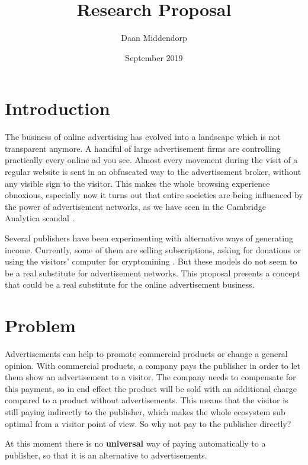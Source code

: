 \documentclass[a4paper]{article}
\title{Research Proposal}
\author{Daan Middendorp}
\date{September 2019}
\begin{document}
\maketitle

\section{Introduction}

\sffamily
The business of online advertising has evolved into a landscape which is not transparent anymore. A handful of large advertisement firms are controlling practically every online ad you see. Almost every movement during the visit of a regular website is sent in an obfuscated way to the advertisement broker, without any visible sign to the visitor. This makes the whole browsing experience obnoxious, especially now it turns out that entire societies are being influenced by the power of advertisement networks, as we have seen in the Cambridge Analytica scandal .

Several publishers have been experimenting with alternative ways of generating income. Currently, some of them are selling subscriptions, asking for donations or using the visitors' computer for cryptomining . But these models do not seem to be a real substitute for advertisement networks. This proposal presents a concept that could be a real substitute for the online advertisement business.

\section{Problem}
Advertisements can help to promote commercial products or change a general opinion. With commercial products, a company pays the publisher in order to let them show an advertisement to a visitor. The company needs to compensate for this payment, so in end effect the product will be sold with an additional charge compared to a product without advertisements. This means that the visitor is still paying indirectly to the publisher, which makes the whole ecosystem sub optimal from a visitor point of view. So why not pay to the publisher directly?

At this moment there is no \textbf{universal} way of paying automatically to a publisher, so that it is an alternative to advertisements.
\end{document}
